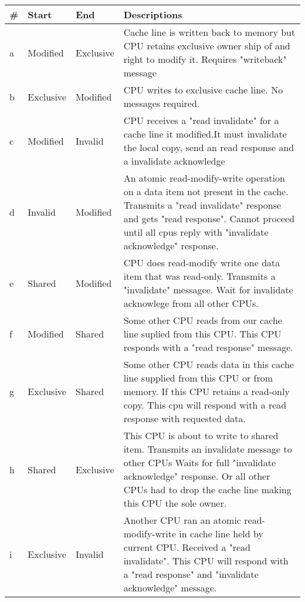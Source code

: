 \documentclass{article}
\begin{document}
\begin{tabular*}{0.75\textwidth} {| l | l | l | p{5cm}| }    
    \hline
    \# & Start  & End   & Descriptions \\
    \hline
    a & Modified  & Exclusive &
    Cache line is written back to memory but CPU retains exclusive 
    owner ship of and right to modify it. Requires "writeback" 
    message\\
    \hline
    b& Exclusive & Modified &  
    CPU writes to exclusive cache line. No messages required. \\
    \hline
    c & Modified & Invalid &   
    CPU receives a "read invalidate" for a cache line it modified.It 
    must invalidate the local copy, send an read response and a 
    invalidate acknowledge \\
    \hline
    d & Invalid & Modified &
    An atomic read-modify-write operation on a data item not present
    in the cache. Transmits a "read invalidate" response and gets
    "read response". Cannot proceed until all cpus reply with
    "invalidate acknowledge" response.    \\

    \hline
    e & Shared & Modified & 

    CPU does read-modify write one data item that was
    read-only. Transmits a "invalidate" messagee. Wait for invalidate
    acknowlege from all other CPUs.    
    \\
    \hline
    f & Modified & Shared &

    Some other CPU reads from our cache line suplied from this
    CPU. This CPU responds with a "read response" message.    
    \\    
    \hline

    g & Exclusive & Shared & 


    Some other CPU reads data in this cache line supplied from this
    CPU or from memory. If this CPU retains a read-only copy. This cpu
    will respond with a read response with requested data.
    
    \\
    \hline
    h & Shared & Exclusive & 

    This CPU is about to write to shared item. Transmits an invalidate
    message to other CPUs Waits for full "invalidate acknowledge"
    response. Or all other CPUs had to drop the cache line making this
    CPU the sole owner. \\
    \hline
    i & Exclusive & Invalid & 

    Another CPU ran an atomic read-modify-write in cache line held by
    current CPU. Received a "read invalidate". This CPU will respond
    with a "read response" and "invalidate acknowledge" message.   \\


\end{tabular*}
\end{document}
